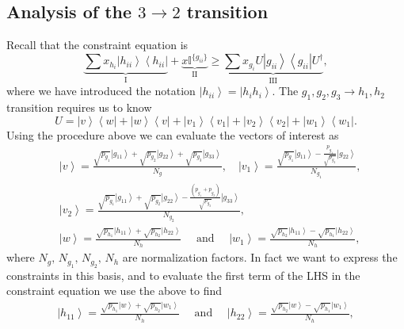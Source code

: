 \documentclass{theoretics}
\begin{document}
\subsection{Analysis of the \texorpdfstring{$3\rightarrow 2$}{3 -> 2} transition}
\label{subsec:appendix3to2}
Recall that the constraint equation is 
\begin{displaymath}
\underbrace{\sum x_{h_{i}}\left|h_{ii}\right\rangle \left\langle h_{ii}\right|}_{\text{I}}+\underbrace{x\mathbb{I}^{\{g_{ii}\}}}_{\text{II}}\ge\underbrace{\sum x_{g_{i}}U\left|g_{ii}\right\rangle \left\langle g_{ii}\right|U^{\dagger}}_{\text{III}},
\end{displaymath}
where we have introduced the notation $\left|h_{ii}\right\rangle =\left|h_{i}h_{i}\right\rangle $. The $g_{1},g_{2},g_{3}\to h_{1},h_{2}$
transition requires us to know 
\begin{displaymath}
U=\left|v\right\rangle \left\langle w\right|+\left|w\right\rangle \left\langle v\right|+\left|v_{1}\right\rangle \left\langle v_{1}\right|+\left|v_{2}\right\rangle \left\langle v_{2}\right|+\left|w_{1}\right\rangle \left\langle w_{1}\right|.
\end{displaymath}
Using the procedure above we can evaluate the vectors of interest as
\begin{align*}
&\left|v\right\rangle   =\frac{\sqrt{p_{g_{1}}}\left|g_{11}\right\rangle +\sqrt{p_{g_{2}}}\left|g_{22}\right\rangle +\sqrt{p_{g_{3}}}\left|g_{33}\right\rangle }{N_{g}},\quad
\left|v_{1}\right\rangle   =\frac{\sqrt{p_{g_{1}}}\left|g_{11}\right\rangle -\frac{p_{g_{1}}}{\sqrt{p_{g_{2}}}}\left|g_{22}\right\rangle }{N_{g_{1}}},\\
&\left|v_{2}\right\rangle   =\frac{\sqrt{p_{g_{1}}}\left|g_{11}\right\rangle +\sqrt{p_{g_{2}}}\left|g_{22}\right\rangle -\frac{\left(p_{g_{1}}+p_{g_{2}}\right)}{\sqrt{p_{g_{3}}}}\left|g_{33}\right\rangle }{N_{g_{2}}},\\
&\left|w\right\rangle   =\frac{\sqrt{p_{h_{1}}}\left|h_{11}\right\rangle +\sqrt{p_{h_{2}}}\left|h_{22}\right\rangle }{N_{h}}\quad\text{ and }\quad
\left|w_{1}\right\rangle   =\frac{\sqrt{p_{h_{2}}}\left|h_{11}\right\rangle -\sqrt{p_{h_{1}}}\left|h_{22}\right\rangle }{N_{h}},
\end{align*}
where $N_{g},\,N_{g_{1}},\,N_{g_{2}},\,N_{h}$ are normalization factors.
In fact we want to express the constraints in this basis, and to evaluate
the first term of the LHS in the constraint equation we use the above to find 
\begin{align*}
\left|h_{11}\right\rangle   =\frac{\sqrt{p_{h_{1}}}\left|w\right\rangle +\sqrt{p_{h_{2}}}\left|w_{1}\right\rangle }{N_{h}}\quad \text{ and }\quad
\left|h_{22}\right\rangle   =\frac{\sqrt{p_{h_{2}}}\left|w\right\rangle -\sqrt{p_{h_{1}}}\left|w_{1}\right\rangle }{N_{h}},
\end{align*}
\end{document}
